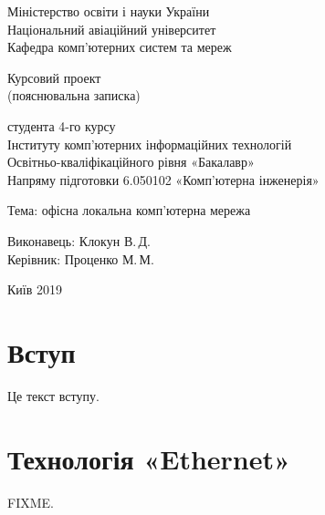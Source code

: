 \documentclass[
  ukrainian,
  simple,
]{eskdnaukvd}
\begin{document}

  \begin{titlepage}
  \begin{center}
      Міністерство освіти і науки України\\
      Національний авіаційний університет\\
      Кафедра комп'ютерних систем та мереж

      \vspace{\fill}
      Курсовий проект\\
      (пояснювальна записка)\\

      \vspace{1 \baselineskip}

      студента 4-го курсу\\
      Інституту комп'ютерних інформаційних технологій\\
      Освітньо-кваліфікаційного рівня «Бакалавр»\\
      Напряму підготовки 6.050102 «Комп'ютерна інженерія»

      \vspace{1 \baselineskip}

      \begin{flushleft}
      Тема: офісна локальна комп'ютерна мережа

      \vspace{2 \baselineskip}

      Виконавець: \hfill Клокун В.\,Д.\\
      Керівник: \hfill Проценко М.\,М.
      \end{flushleft}

      \vspace{\fill}

      Київ 2019
    \end{center}
  \end{titlepage}

  \newpage

  \setcounter{page}{2}
  \section*{Вступ}
    Це текст вступу.

  \section{Технологія «\textenglish{Ethernet}»}
    FIXME.
\end{document}
